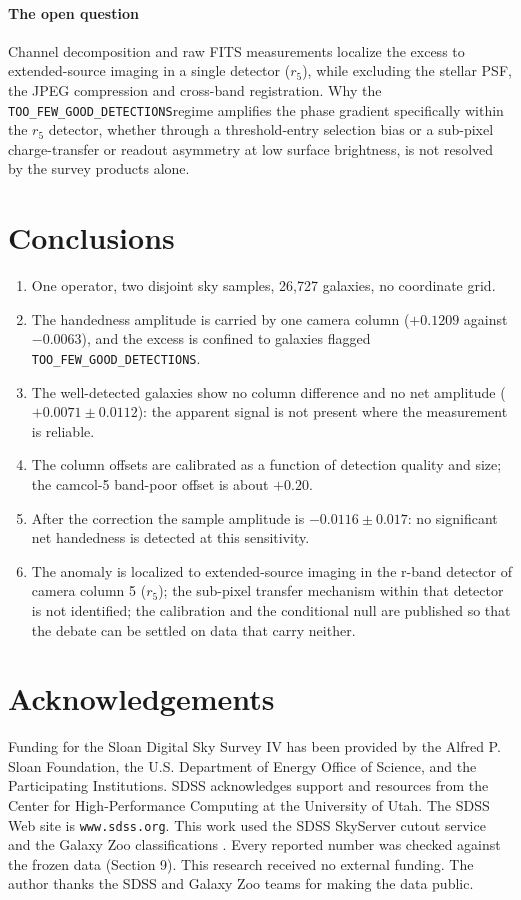 \documentclass[preprint,12pt,authoryear]{elsarticle}
\newcommand{\toofew}{\texttt{TOO\_\allowbreak FEW\_\allowbreak GOOD\_\allowbreak DETECTIONS}}
\begin{document}
\paragraph{The open question} Channel decomposition and raw FITS measurements localize the excess
to extended-source imaging in a single detector ($r_5$), while excluding the stellar PSF, the JPEG
compression and cross-band registration. Why the \toofew regime amplifies
the phase gradient specifically within the $r_5$ detector, whether through a threshold-entry
selection bias or a sub-pixel charge-transfer or readout asymmetry at low surface brightness, is not
resolved by the survey products alone.

\section{Conclusions}
\begin{enumerate}
\item One operator, two disjoint sky samples, 26,727 galaxies, no coordinate grid.
\item The handedness amplitude is carried by one camera column ($+0.1209$ against $-0.0063$), and
the excess is confined to galaxies flagged \toofew.
\item The well-detected galaxies show no column difference and no net amplitude
($+0.0071 \pm 0.0112$): the apparent signal is not present where the measurement is reliable.
\item The column offsets are calibrated as a function of detection quality and size; the camcol-5
band-poor offset is about $+0.20$.
\item After the correction the sample amplitude is $-0.0116 \pm 0.017$: no significant net
handedness is detected at this sensitivity.
\item The anomaly is localized to extended-source imaging in the r-band detector of camera column 5
($r_5$); the sub-pixel transfer mechanism within that detector is not identified; the calibration
and the conditional null are published so that the debate can be settled on data that carry
neither.
\end{enumerate}

\section*{Acknowledgements}
Funding for the Sloan Digital Sky Survey IV has been provided by the Alfred P. Sloan Foundation, the
U.S. Department of Energy Office of Science, and the Participating Institutions. SDSS acknowledges
support and resources from the Center for High-Performance Computing at the University of Utah. The
SDSS Web site is \texttt{www.sdss.org}. This work used the SDSS SkyServer cutout service
\citep{sdssdr18} and the Galaxy Zoo classifications \citep{lintott2008, masters2021}. Every reported number was checked against the frozen data (Section 9). This research received no external funding. The author thanks the SDSS and Galaxy Zoo teams for making the data
public.
\end{document}
